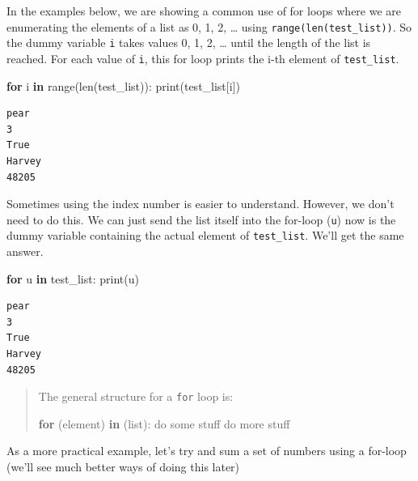 \documentclass[
  letterpaper,
]{scrbook}
\newenvironment{Shaded}{\begin{snugshade}}{\end{snugshade}}
\newcommand{\BuiltInTok}[1]{#1}
\newcommand{\ControlFlowTok}[1]{\textcolor[rgb]{0.13,0.29,0.53}{\textbf{#1}}}
\newcommand{\KeywordTok}[1]{\textcolor[rgb]{0.13,0.29,0.53}{\textbf{#1}}}
\newcommand{\NormalTok}[1]{#1}
\begin{document}
In the examples below, we are showing a common use of for loops where we are enumerating the elements of a list as 0, 1, 2, \ldots{} using \texttt{range(len(test\_list))}. So the dummy variable \texttt{i} takes values 0, 1, 2, \ldots{} until the length of the list is reached. For each value of \texttt{i}, this for loop prints the i-th element of \texttt{test\_list}.

\begin{Shaded}
\begin{Highlighting}[]
\ControlFlowTok{for}\NormalTok{ i }\KeywordTok{in} \BuiltInTok{range}\NormalTok{(}\BuiltInTok{len}\NormalTok{(test_list)):}
    \BuiltInTok{print}\NormalTok{(test_list[i])}
\end{Highlighting}
\end{Shaded}

\begin{verbatim}
pear
3
True
Harvey
48205
\end{verbatim}

Sometimes using the index number is easier to understand. However, we don't need to do this. We can just send the list itself into the for-loop (\texttt{u}) now is the dummy variable containing the actual element of \texttt{test\_list}. We'll get the same answer.

\begin{Shaded}
\begin{Highlighting}[]
\ControlFlowTok{for}\NormalTok{ u }\KeywordTok{in}\NormalTok{ test_list:}
    \BuiltInTok{print}\NormalTok{(u)}
\end{Highlighting}
\end{Shaded}

\begin{verbatim}
pear
3
True
Harvey
48205
\end{verbatim}

\begin{quote}
The general structure for a \texttt{for} loop is:

\begin{Shaded}
\begin{Highlighting}[]
\ControlFlowTok{for}\NormalTok{ (element) }\KeywordTok{in}\NormalTok{ (}\BuiltInTok{list}\NormalTok{):}
\NormalTok{      do some stuff}
\NormalTok{      do more stuff}
\end{Highlighting}
\end{Shaded}
\end{quote}

As a more practical example, let's try and sum a set of numbers using a for-loop (we'll see much better ways of doing this later)
\end{document}
